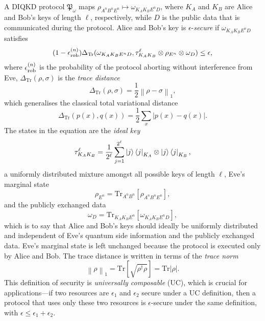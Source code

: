 \documentclass[10pt, a4paper]{article}
\numberwithin{equation}{section} %
\theoremstyle{definition}
\theoremstyle{plain}
\newcommand{\norm}[1]{\left\lVert#1\right\rVert}
\newcommand{\abs}[1]{\left\lvert#1\right\rvert}
\newcommand{\?}{\mathrel{?}} %
\newcommand{\Tr}{\mathrm{Tr}} %
\newcommand{\rob}{\rm rob}
\newcommand{\erob}[1]{\epsilon_{\rob}^{(#1)}}
\begin{document}
    A DIQKD protocol \(\mathfrak{P}_{\omega}\) maps \(\rho_{A^n B^n E^n} \mapsto \omega_{K_A K_B E^n D}\), where \(K_A\) and \(K_B\) are Alice and Bob's keys of length \(\ell\), respectively, while \(D\) is the public data that is communicated during the protocol. Alice and Bob's key is \(\epsilon\)-\emph{secure} if \(\omega_{K_A K_B E^n D}\) satisfies~\cite{SecurityQKD}
    \begin{equation}
      (1-\erob{n})\Delta_{\Tr}(\omega_{K_A K_B E^n D}, \tau_{K_A K_B}^{\ell} \otimes \rho_{E^n} \otimes \omega_D) \leq \epsilon,
    \end{equation}
    where \(\erob{n}\) is the probability of the protocol aborting without interference from Eve, \(\Delta_{\Tr}(\rho,\sigma)\) is the \emph{trace distance}
    \begin{equation}
      \Delta_{\Tr}(\rho, \sigma) = \frac{1}{2}\norm{\rho - \sigma}_1,
    \end{equation}
    which generalises the classical total variational distance
    \[ \Delta_{\Tr}(p(x),q(x)) = \frac{1}{2} \sum_{x} \abs{p(x)-q(x)}. \]
    The states in the equation are the \emph{ideal key}
    \begin{equation}
      \tau_{K_A K_B}^{\ell} = \frac{1}{2^{\ell}} \sum_{j=1}^{2^{\ell}} \ket{j}\bra{j}_{K_A} \otimes \ket{j}\bra{j}_{K_B},
    \end{equation}
    a uniformly distributed mixture amongst all possible keys of length \(\ell\), Eve's marginal state
    \begin{equation}
      \rho_{E^n} = \Tr_{A^n B^n}\left[ \rho_{A^n B^n E^n} \right],
    \end{equation}
    and the publicly exchanged data
    \begin{equation}
      \omega_D = \Tr_{K_A K_B E^n}\left[ \omega_{K_A K_B E^n D} \right],
    \end{equation} 
    which is to say that Alice and Bob's keys should ideally be uniformly distributed and independent of Eve's quantum side information and the publicly exchanged data. Eve's marginal state is left unchanged because the protocol is executed only by Alice and Bob. The trace distance is written in terms of the \emph{trace norm}
    \begin{equation}
      \norm{\rho}_1 = \Tr\left[ \sqrt{\rho^{\dagger}\rho} \right] = \Tr\abs{\rho}.
    \end{equation}
    This definition of security is \emph{universally composable} (UC), which is crucial for applications---if two resources are \(\epsilon_1\) and \(\epsilon_2\) secure under a UC definition, then a protocol that uses only these two resources is \(\epsilon\)-secure under the same definition, with \(\epsilon \leq \epsilon_1 + \epsilon_2\).
\end{document}
